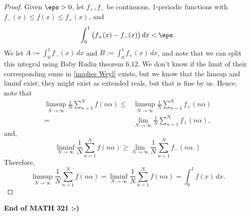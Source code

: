 \begin{proof}
    Given \(\eps>0\), let \(f_+, f_-\) be continuous, 1-periodic functions with \(f_-(x)\leq f(x)\leq f_+(x)\), and 
    \begin{equation*} 
        \int_0^1 \big(f_+(x)-f_-(x)\big) \, dx<\eps.
    \end{equation*}
    We let \(A:=\displaystyle\int_0^1 f_-(x) \, dx\) and \(B:=\displaystyle\int_0^1 f_+(x) \, dx\), and note that we can split this integral using Baby Rudin theorem 6.12. We don't know if the limit of their corresponding sums in \cref{implies Weyl} exists, but we know that the limsup and liminf exist; they might exist as extended reals, but that is fine by us. Hence, note that
    \begin{align*} 
        \limsup_{N\to\infty}\frac{1}{N}\sum_{n=1}^N f(n\alpha)\leq&\limsup_{N\to\infty}\frac{1}{N}\sum_{n=1}^Nf_+(n\alpha)\\
        =&\lim_{N\to\infty}\frac{1}{N}\sum_{n=1}^Nf_+(n\alpha),
    \end{align*}
    and,
    \begin{equation*} 
        \liminf_{N\to\infty}\frac{1}{N}\sum_{n=1}^N f(n\alpha)\geq\lim_{N\to\infty}\frac{1}{N}\sum_{n=1}^N f_-(n\alpha.)
    \end{equation*}
    Therefore, 
    \begin{equation*} 
        \limsup_{N\to\infty}\frac{1}{N}\sum_{n=1}^N f(n\alpha)=\liminf_{N\to\infty}\frac{1}{N}\sum_{n=1}^N f(n\alpha)=\int_0^1 f(x) \, dx.
    \end{equation*}
\end{proof}

\begin{center}
    \textbf{End of MATH 321 :-)}
\end{center}

\begin{comment}
    \begin{proof}[``Proof'' by example]
    We don't prove this here, but show an example. If \(\mc{I}\subseteq[0,1)\) is an interval, let \(f\) be periodic \(\mc{I}\) and \(f(x)=\chi_{\mc{I}}(x)\) on \([0,1)\). If \(\mc{I}=\displaystyle\left(\frac{1}{2},\frac{3}{4}\right)\), then it can be inferred after some work that \cref{implies Weyl} implies Theorem F.
\end{proof}
\end{comment}



